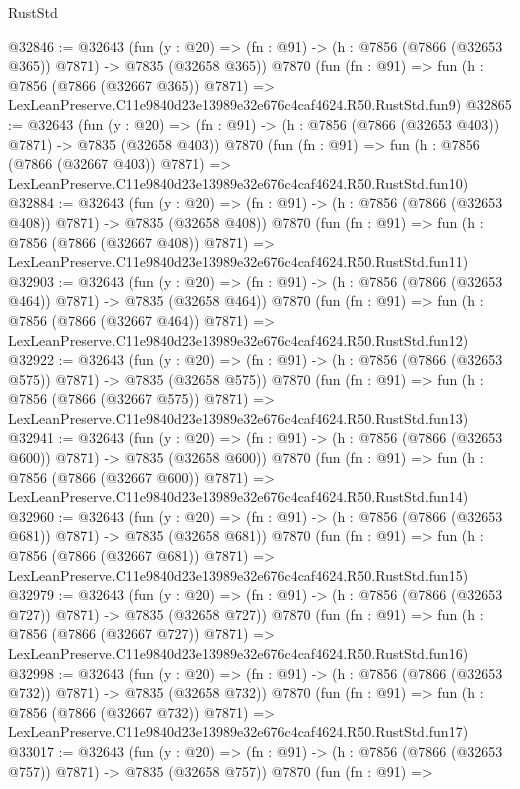 \begin{lexlean}{RustStd}
\begin{coremodule}
@32846 := @32643
    (fun (y : @20) => (fn : @91) -> (h : @7856 (@7866 (@32653 @365)) @7871) -> @7835 (@32658 @365))
    @7870
    (fun (fn : @91) =>
    fun (h : @7856 (@7866 (@32667 @365)) @7871) =>
    LexLeanPreserve.C11e9840d23e13989e32e676c4caf4624.R50.RustStd.fun9)
@32865 := @32643
    (fun (y : @20) => (fn : @91) -> (h : @7856 (@7866 (@32653 @403)) @7871) -> @7835 (@32658 @403))
    @7870
    (fun (fn : @91) =>
    fun (h : @7856 (@7866 (@32667 @403)) @7871) =>
    LexLeanPreserve.C11e9840d23e13989e32e676c4caf4624.R50.RustStd.fun10)
@32884 := @32643
    (fun (y : @20) => (fn : @91) -> (h : @7856 (@7866 (@32653 @408)) @7871) -> @7835 (@32658 @408))
    @7870
    (fun (fn : @91) =>
    fun (h : @7856 (@7866 (@32667 @408)) @7871) =>
    LexLeanPreserve.C11e9840d23e13989e32e676c4caf4624.R50.RustStd.fun11)
@32903 := @32643
    (fun (y : @20) => (fn : @91) -> (h : @7856 (@7866 (@32653 @464)) @7871) -> @7835 (@32658 @464))
    @7870
    (fun (fn : @91) =>
    fun (h : @7856 (@7866 (@32667 @464)) @7871) =>
    LexLeanPreserve.C11e9840d23e13989e32e676c4caf4624.R50.RustStd.fun12)
@32922 := @32643
    (fun (y : @20) => (fn : @91) -> (h : @7856 (@7866 (@32653 @575)) @7871) -> @7835 (@32658 @575))
    @7870
    (fun (fn : @91) =>
    fun (h : @7856 (@7866 (@32667 @575)) @7871) =>
    LexLeanPreserve.C11e9840d23e13989e32e676c4caf4624.R50.RustStd.fun13)
@32941 := @32643
    (fun (y : @20) => (fn : @91) -> (h : @7856 (@7866 (@32653 @600)) @7871) -> @7835 (@32658 @600))
    @7870
    (fun (fn : @91) =>
    fun (h : @7856 (@7866 (@32667 @600)) @7871) =>
    LexLeanPreserve.C11e9840d23e13989e32e676c4caf4624.R50.RustStd.fun14)
@32960 := @32643
    (fun (y : @20) => (fn : @91) -> (h : @7856 (@7866 (@32653 @681)) @7871) -> @7835 (@32658 @681))
    @7870
    (fun (fn : @91) =>
    fun (h : @7856 (@7866 (@32667 @681)) @7871) =>
    LexLeanPreserve.C11e9840d23e13989e32e676c4caf4624.R50.RustStd.fun15)
@32979 := @32643
    (fun (y : @20) => (fn : @91) -> (h : @7856 (@7866 (@32653 @727)) @7871) -> @7835 (@32658 @727))
    @7870
    (fun (fn : @91) =>
    fun (h : @7856 (@7866 (@32667 @727)) @7871) =>
    LexLeanPreserve.C11e9840d23e13989e32e676c4caf4624.R50.RustStd.fun16)
@32998 := @32643
    (fun (y : @20) => (fn : @91) -> (h : @7856 (@7866 (@32653 @732)) @7871) -> @7835 (@32658 @732))
    @7870
    (fun (fn : @91) =>
    fun (h : @7856 (@7866 (@32667 @732)) @7871) =>
    LexLeanPreserve.C11e9840d23e13989e32e676c4caf4624.R50.RustStd.fun17)
@33017 := @32643
    (fun (y : @20) => (fn : @91) -> (h : @7856 (@7866 (@32653 @757)) @7871) -> @7835 (@32658 @757))
    @7870
    (fun (fn : @91) =>

\end{coremodule}
\end{lexlean}
